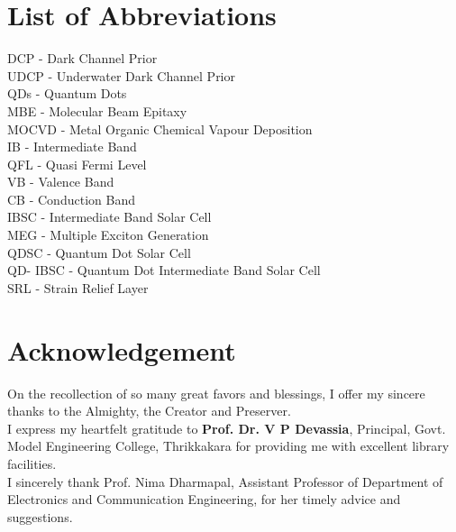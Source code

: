 \documentclass[hidelinks, 12pt]{report}
\begin{document}
\section*{List of Abbreviations}
\begin{flushleft}
DCP -  Dark Channel Prior\\ 
\vspace{0.5cm}
UDCP - Underwater Dark Channel Prior\\
\vspace{0.5cm}
QDs - Quantum Dots\\
\vspace{0.5cm}
MBE - Molecular Beam Epitaxy\\
\vspace{0.5cm}
MOCVD - Metal Organic Chemical Vapour Deposition\\
\vspace{0.5cm}
IB - Intermediate Band\\
\vspace{0.5cm}
QFL - Quasi Fermi Level\\
\vspace{0.5cm}
VB - Valence Band\\
\vspace{0.5cm}
CB - Conduction Band\\ 
\vspace{0.5cm}
IBSC - Intermediate Band Solar Cell\\
\vspace{0.5cm}
MEG - Multiple Exciton Generation\\
\vspace{0.5cm}
QDSC - Quantum Dot Solar Cell\\
\vspace{0.5cm}
QD- IBSC - Quantum Dot Intermediate Band Solar Cell\\
\vspace{0.5cm}
SRL - Strain Relief Layer\\
\end{flushleft}
\pagebreak

\section*{Acknowledgement}
\justify
On the recollection of so many great favors and blessings, I offer my sincere thanks to the Almighty, the Creator and Preserver.\\

I express my heartfelt gratitude to \textbf{Prof. Dr. V P Devassia}, Principal, Govt. Model Engineering College, Thrikkakara for providing me with excellent library facilities. \\
I sincerely thank Prof. Nima Dharmapal, Assistant Professor of Department of Electronics and Communication Engineering, for her timely advice and suggestions.\\
\end{document}
